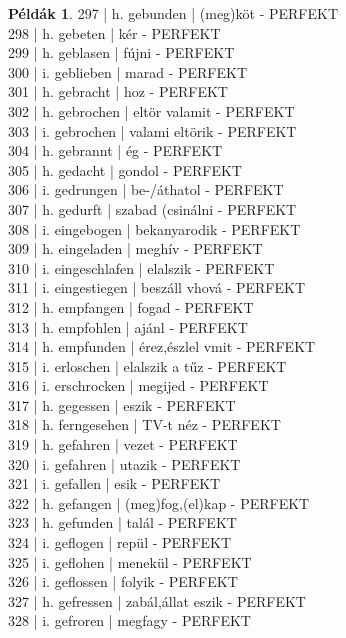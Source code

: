 \documentclass{article}
\theoremstyle{definition}
\newtheorem*{exmp}{Példák}
\begin{document}
\begin{exmp}
297 | h. gebunden | (meg)köt - PERFEKT\\
298 | h. gebeten | kér - PERFEKT\\
299 | h. geblasen | fújni - PERFEKT\\
300 | i. geblieben | marad - PERFEKT\\
301 | h. gebracht | hoz - PERFEKT\\
302 | h. gebrochen | eltör valamit - PERFEKT\\
303 | i. gebrochen | valami eltörik - PERFEKT\\
304 | h. gebrannt | ég - PERFEKT\\
305 | h. gedacht | gondol - PERFEKT\\
306 | i. gedrungen | be-/áthatol - PERFEKT\\
307 | h. gedurft | szabad (csinálni - PERFEKT\\
308 | i. eingebogen | bekanyarodik - PERFEKT\\
309 | h. eingeladen | meghív - PERFEKT\\
310 | i. eingeschlafen | elalszik - PERFEKT\\
311 | i. eingestiegen | beszáll vhová - PERFEKT\\
312 | h. empfangen | fogad - PERFEKT\\
313 | h. empfohlen | ajánl - PERFEKT\\
314 | h. empfunden | érez,észlel vmit - PERFEKT\\
315 | i. erloschen | elalszik a tűz - PERFEKT\\
316 | i. erschrocken | megijed - PERFEKT\\
317 | h. gegessen | eszik - PERFEKT\\
318 | h. ferngesehen | TV-t néz - PERFEKT\\
319 | h. gefahren | vezet - PERFEKT\\
320 | i. gefahren | utazik - PERFEKT\\
321 | i. gefallen | esik - PERFEKT\\
322 | h. gefangen | (meg)fog,(el)kap - PERFEKT\\
323 | h. gefunden | talál - PERFEKT\\
324 | i. geflogen | repül - PERFEKT\\
325 | i. geflohen | menekül - PERFEKT\\
326 | i. geflossen | folyik - PERFEKT\\
327 | h. gefressen | zabál,állat eszik - PERFEKT\\
328 | i. gefroren | megfagy - PERFEKT\\

\end{exmp}
\end{document}
